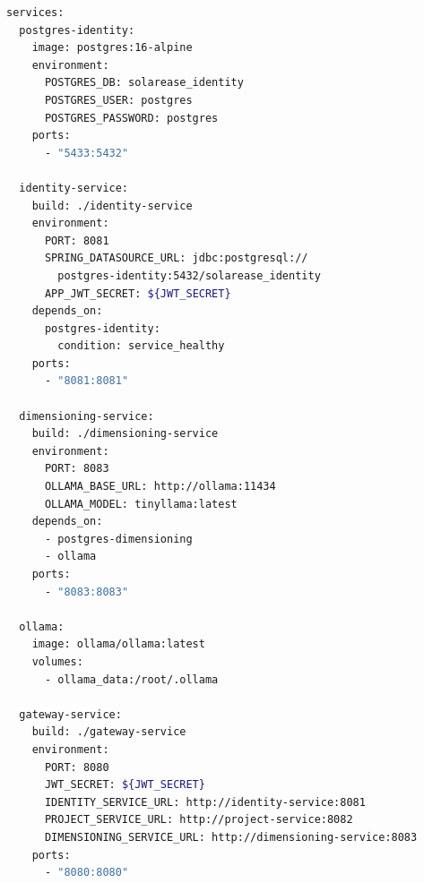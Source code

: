 \begin{tcolorbox}[colback=black!5, colframe=figblue!80!black, arc=4pt, 
                  title={\textbf{docker-compose.yml} -- Extrait de l'environnement},
                  colbacktitle=figblue, fonttitle=\small\ttfamily]
\begin{lstlisting}[language=bash]
services:
  postgres-identity:
    image: postgres:16-alpine
    environment:
      POSTGRES_DB: solarease_identity
      POSTGRES_USER: postgres
      POSTGRES_PASSWORD: postgres
    ports:
      - "5433:5432"

  identity-service:
    build: ./identity-service
    environment:
      PORT: 8081
      SPRING_DATASOURCE_URL: jdbc:postgresql://
        postgres-identity:5432/solarease_identity
      APP_JWT_SECRET: ${JWT_SECRET}
    depends_on:
      postgres-identity:
        condition: service_healthy
    ports:
      - "8081:8081"

  dimensioning-service:
    build: ./dimensioning-service
    environment:
      PORT: 8083
      OLLAMA_BASE_URL: http://ollama:11434
      OLLAMA_MODEL: tinyllama:latest
    depends_on:
      - postgres-dimensioning
      - ollama
    ports:
      - "8083:8083"

  ollama:
    image: ollama/ollama:latest
    volumes:
      - ollama_data:/root/.ollama

  gateway-service:
    build: ./gateway-service
    environment:
      PORT: 8080
      JWT_SECRET: ${JWT_SECRET}
      IDENTITY_SERVICE_URL: http://identity-service:8081
      PROJECT_SERVICE_URL: http://project-service:8082
      DIMENSIONING_SERVICE_URL: http://dimensioning-service:8083
    ports:
      - "8080:8080"
\end{lstlisting}
\end{tcolorbox}

\cleardoublepage
